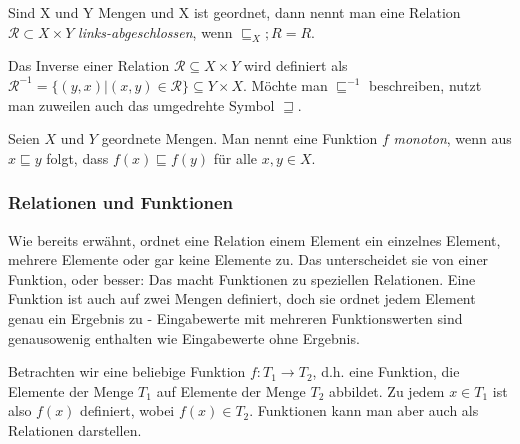 Sind X und Y Mengen und X ist geordnet, dann nennt man eine Relation $\mathcal{R} \subset X \times Y$ \textit{links-abgeschlossen},
 wenn $\sqsubseteq_{X} ; R = R$.

Das Inverse einer Relation $\mathcal{R} \subseteq X \times Y$ wird definiert als $\mathcal{R}^{-1} = \{(y, x) | (x, y) \in \mathcal{R}\}
\subseteq Y \times X$. Möchte man $\sqsubseteq^{-1}$ beschreiben, nutzt man zuweilen auch das umgedrehte Symbol $\sqsupseteq$.

Seien $X$ und $Y$ geordnete Mengen. Man nennt eine Funktion $f$ \textit{monoton}, wenn aus $x \sqsubseteq y$ folgt, dass
$f(x) \sqsubseteq f(y)$ für alle $x, y \in X$.

%

\subsubsection{Relationen und Funktionen}

Wie bereits erwähnt, ordnet eine Relation einem Element ein einzelnes Element, mehrere Elemente oder gar keine Elemente zu.
Das unterscheidet sie von einer Funktion, oder besser: Das macht Funktionen zu speziellen Relationen. Eine
Funktion ist auch auf zwei Mengen definiert, doch sie ordnet jedem Element genau ein Ergebnis zu - Eingabewerte mit
mehreren Funktionswerten sind genausowenig enthalten wie Eingabewerte ohne Ergebnis.

Betrachten wir eine beliebige Funktion $f : T_1 \rightarrow T_2$, d.h. eine Funktion, die Elemente der Menge $T_1$ auf
Elemente der Menge $T_2$ abbildet. Zu jedem $x \in T_1$ ist also $f(x)$ definiert, wobei $f(x) \in T_2$. Funktionen kann
man aber auch als Relationen darstellen.

